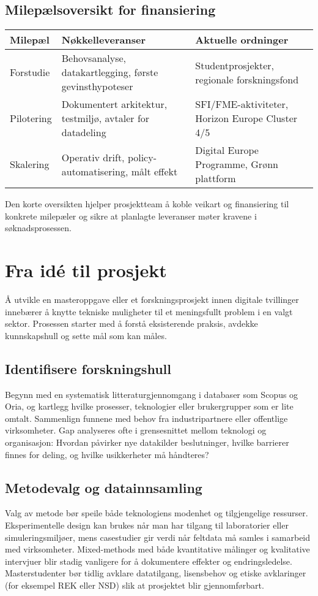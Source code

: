 \subsection*{Milepælsoversikt for finansiering}
\begin{table}[h]
    \centering
    \begin{tabular}{p{3.0cm}p{5.0cm}p{4.2cm}}
        \toprule
        Milepæl & Nøkkelleveranser & Aktuelle ordninger \\
        \midrule
        Forstudie & Behovsanalyse, datakartlegging, første gevinsthypoteser & Studentprosjekter, regionale forskningsfond \\
        Pilotering & Dokumentert arkitektur, testmiljø, avtaler for datadeling & SFI/FME-aktiviteter, Horizon Europe Cluster 4/5 \\
        Skalering & Operativ drift, policy-automatisering, målt effekt & Digital Europe Programme, Grønn plattform \\
        \bottomrule
    \end{tabular}
\end{table}

Den korte oversikten hjelper prosjektteam å koble veikart og finansiering til konkrete milepæler og sikre at planlagte leveranser møter kravene i søknadsprosessen.\citep{rcn2024programkatalog,rcn2024digitalisering}

\section{Fra idé til prosjekt}
Å utvikle en masteroppgave eller et forskningsprosjekt innen digitale tvillinger innebærer å knytte tekniske muligheter til et meningsfullt problem i en valgt sektor. Prosessen starter med å forstå eksisterende praksis, avdekke kunnskapshull og sette mål som kan måles.

\subsection{Identifisere forskningshull}
Begynn med en systematisk litteraturgjennomgang i databaser som Scopus og Oria, og kartlegg hvilke prosesser, teknologier eller brukergrupper som er lite omtalt. Sammenlign funnene med behov fra industripartnere eller offentlige virksomheter. Gap analyseres ofte i grensesnittet mellom teknologi og organisasjon: Hvordan påvirker nye datakilder beslutninger, hvilke barrierer finnes for deling, og hvilke usikkerheter må håndteres?

\subsection{Metodevalg og datainnsamling}
Valg av metode bør speile både teknologiens modenhet og tilgjengelige ressurser. Eksperimentelle design kan brukes når man har tilgang til laboratorier eller simuleringsmiljøer, mens casestudier gir verdi når feltdata må samles i samarbeid med virksomheter. Mixed-methods med både kvantitative målinger og kvalitative intervjuer blir stadig vanligere for å dokumentere effekter og endringsledelse. Masterstudenter bør tidlig avklare datatilgang, lisensbehov og etiske avklaringer (for eksempel REK eller NSD) slik at prosjektet blir gjennomførbart.

